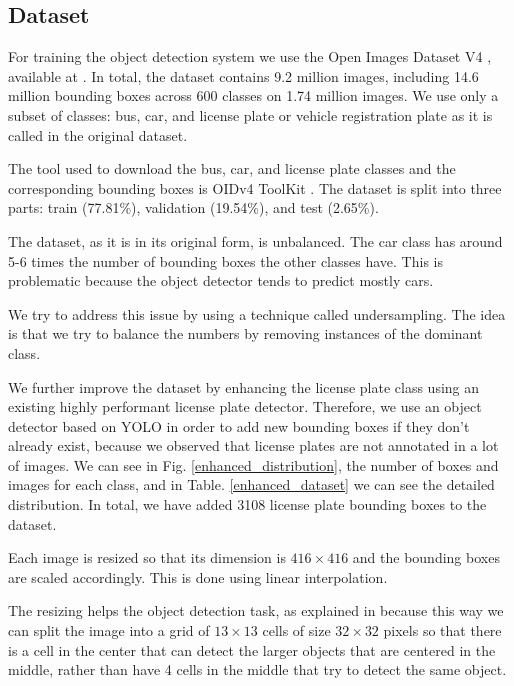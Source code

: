\subsection{Dataset}
    For training the object detection system we use the Open Images Dataset V4 \cite{openImages}, available at \cite{openImagesSite}. In total, the dataset contains 9.2 million images, including 14.6 million bounding boxes across 600 classes on 1.74 million images. We use only a subset of classes: bus, car, and license plate or vehicle registration plate as it is called in the original dataset. 
    
    The tool used to download the bus, car, and license plate classes and the corresponding bounding boxes is OIDv4 ToolKit \cite{OIDv4_ToolKit}. The dataset is split into three parts: train (77.81\%), validation (19.54\%), and test (2.65\%).
    
    The dataset, as it is in its original form, is unbalanced. The car class has around 5-6 times the number of bounding boxes the other classes have. This is problematic because the object detector tends to predict mostly cars.
    
    We try to address this issue by using a technique called undersampling. The idea is that we try to balance the numbers by removing instances of the dominant class.
    
    We further improve the dataset by enhancing the license plate class using an existing highly performant license plate detector. Therefore, we use an object detector based on YOLO \cite{license_plate_enhancer} in order to add new bounding boxes if they don't already exist, because we observed that license plates are not annotated in a lot of images. We can see in Fig. \ref{enhanced_distribution}, the number of boxes and images for each class, and in Table. \ref{enhanced_dataset} we can see the detailed distribution. In total, we have added 3108 license plate bounding boxes to the dataset.

    
    
    
    Each image is resized so that its dimension is $416 \times 416$ and the bounding boxes are scaled accordingly. This is done using linear interpolation.
     
    The resizing helps the object detection task, as explained in \cite{yolov2} because this way we can split the image into a grid of $13 \times 13$ cells of size $32 \times 32$ pixels so that there is a cell in the center that can detect the larger objects that are centered in the middle, rather than have 4 cells in the middle that try to detect the same object.
    

